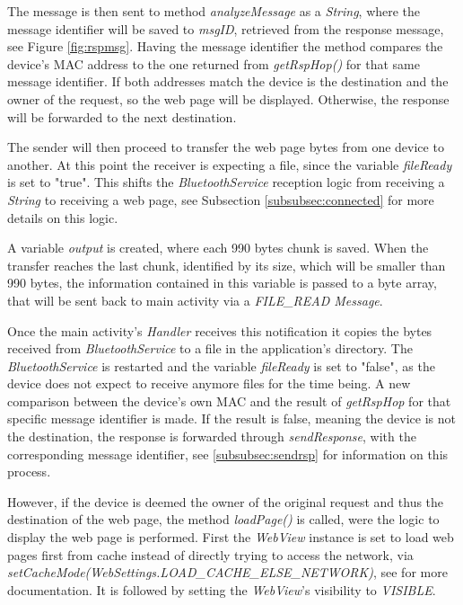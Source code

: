 The message is then sent to method \textit{analyzeMessage} as a \textit{String}, where the message identifier will be saved to \textit{msgID}, retrieved from the response message, see Figure \ref{fig:rspmsg}. Having the message identifier the method compares the device's \gls{MAC} address to the one returned from \textit{getRspHop()} for that same message identifier. If both addresses match the device is the destination and the owner of the request, so the web page will be displayed. Otherwise, the response will be forwarded to the next destination.

The sender will then proceed to transfer the web page bytes from one device to another. At this point the receiver is expecting a file, since the variable \textit{fileReady} is set to "true". This shifts the \textit{BluetoothService} reception logic from receiving a \textit{String} to receiving a web page, see Subsection \ref{subsubsec:connected} for more details on this logic.

A variable \textit{output} is created, where each 990 bytes chunk is saved. When the transfer reaches the last chunk, identified by its size, which will be smaller than 990 bytes, the information contained in this variable is passed to a byte array, that will be sent back to main activity via a \textit{FILE\_READ Message}.

Once the main activity's \textit{Handler} receives this notification it copies the bytes received from \textit{BluetoothService} to a file in the application's directory. The \textit{BluetoothService} is restarted and the variable \textit{fileReady} is set to "false", as the device does not expect to receive anymore files for the time being. A new comparison between the device's own \gls{MAC} and the result of \textit{getRspHop} for that specific message identifier is made. If the result is false, meaning the device is not the destination, the response is forwarded through \textit{sendResponse}, with the corresponding message identifier, see \ref{subsubsec:sendrsp} for information on this process.

However, if the device is deemed the owner of the original request and thus the destination of the web page, the method \textit{loadPage()} is called, were the logic to display the web page is performed. First the \textit{WebView} instance is set to load web pages first from cache instead of directly trying to access the network, via \textit{setCacheMode(WebSettings.LOAD\_CACHE\_ELSE\_NETWORK)}, see \cite{webview} for more documentation. It is followed by setting the \textit{WebView}'s visibility to \textit{VISIBLE}.


